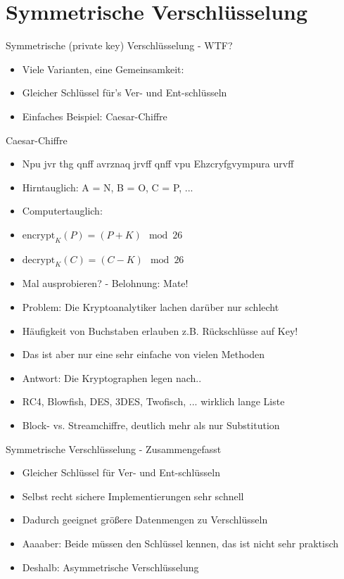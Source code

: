 \section{Symmetrische Verschlüsselung}
  \begin{frame}{Symmetrische (private key) Verschlüsselung - WTF?}
    \begin{itemize}
      \item{Viele Varianten, eine Gemeinsamkeit:}
      \item{Gleicher Schlüssel für's Ver- und Ent-schlüsseln}
      \item{Einfaches Beispiel: Caesar-Chiffre}
    \end{itemize}
  \end{frame}
  \begin{frame}{Caesar-Chiffre}
    \begin{itemize}
      \item{Npu jvr thg qnff avrznaq jrvff qnff vpu Ehzcryfgvympura urvff}
      \item{Hirntauglich: A = N, B = O, C = P, ...}
      \item{Computertauglich:}
      \item{$\text{encrypt}_K(P) = (P + K) \mod{26}$}
      \item{$\text{decrypt}_K(C) = (C - K) \mod{26}$}
      \item{Mal ausprobieren? - Belohnung: Mate!}
    \end{itemize}
  \end{frame}
  \begin{frame}{}
    \begin{itemize}
      \item{Problem: Die Kryptoanalytiker lachen darüber nur schlecht}
      \item{Häufigkeit von Buchstaben erlauben z.B. Rückschlüsse auf Key!}
      \item{Das ist aber nur eine sehr einfache von vielen Methoden}
      \item{Antwort: Die Kryptographen legen nach..}
      \item{RC4, Blowfish, DES, 3DES, Twofisch, ... wirklich lange Liste}
      \item{Block- vs. Streamchiffre, deutlich mehr als nur Substitution}
    \end{itemize}
  \end{frame}
  \begin{frame}{Symmetrische Verschlüsselung - Zusammengefasst}
    \begin{itemize}
      \item{Gleicher Schlüssel für Ver- und Ent-schlüsseln}
      \item{Selbst recht sichere Implementierungen sehr schnell}
      \item{Dadurch geeignet größere Datenmengen zu Verschlüsseln}
      \item{Aaaaber: Beide müssen den Schlüssel kennen, das ist nicht sehr praktisch}
      \item{Deshalb: Asymmetrische Verschlüsselung}
    \end{itemize}
  \end{frame}
